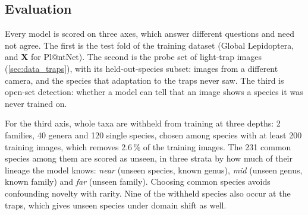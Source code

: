 \subsection{Evaluation}\label{sec:evaluation}
Every model is scored on three axes, which answer different questions and need not agree.
The first is the test fold of the training dataset (Global Lepidoptera, and \textbf{X} for Pl@ntNet).
The second is the probe set of light-trap images (\cref{sec:data_traps}), with its held-out-species subset: images from a different camera, and the species that adaptation to the traps never saw.
The third is open-set detection: whether a model can tell that an image shows a species it was never trained on.

For the third axis, whole taxa are withheld from training at three depths: 2 families, 40 genera and 120 single species, chosen among species with at least 200 training images, which removes 2.6\,\% of the training images.
The 231 common species among them are scored as unseen, in three strata by how much of their lineage the model knows: \emph{near} (unseen species, known genus), \emph{mid} (unseen genus, known family) and \emph{far} (unseen family).
Choosing common species avoids confounding novelty with rarity.
Nine of the withheld species also occur at the traps, which gives unseen species under domain shift as well.

